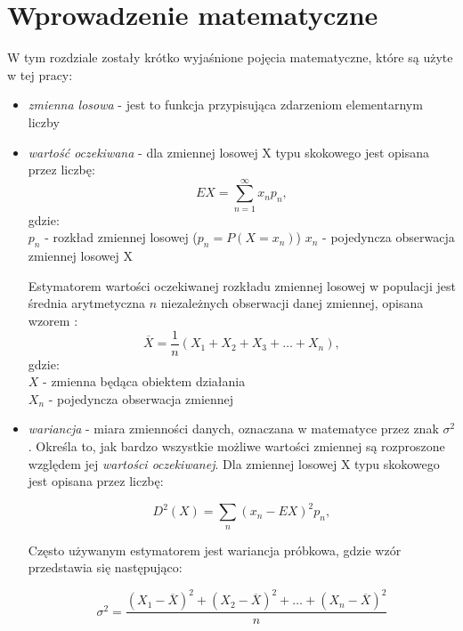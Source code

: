 \documentclass[magister]{dyplom}
\begin{document}
\chapter{Wprowadzenie matematyczne}
W tym rozdziale zostały krótko wyjaśnione pojęcia matematyczne, które są użyte w tej pracy:\\
\begin{itemize}
\item \textit{zmienna losowa} - jest to funkcja przypisująca zdarzeniom elementarnym liczby\cite{random_variable}\newline 

\item \textit{wartość oczekiwana} - dla zmiennej losowej X typu skokowego jest opisana przez liczbę:
\begin{equation}
	EX = \sum_{n=1}^{\infty}x_np_n,
\end{equation}
gdzie:\\
$p_n$ - rozkład zmiennej losowej ($p_n = P(X = x_n)$)
$x_n$ - pojedyncza obserwacja zmiennej losowej X

Estymatorem wartości oczekiwanej rozkładu zmiennej losowej w populacji jest średnia arytmetyczna $n$ niezależnych obserwacji danej zmiennej, opisana wzorem \cite{expected_value}:
\begin{equation}
	\overline{X} = \frac{1}{n}(X_1 + X_2 + X_3 + \dots + X_n),
\end{equation}
gdzie:\\
$X$ - zmienna będąca obiektem działania\\
$X_n$ - pojedyncza obserwacja zmiennej\newline

\item \textit{wariancja} - miara zmienności danych, oznaczana w matematyce przez znak $\sigma^2$. Określa to, jak bardzo wszystkie możliwe wartości zmiennej są rozproszone względem jej \textit{wartości oczekiwanej}. Dla zmiennej losowej X typu skokowego jest opisana przez liczbę:

\begin{equation}
	D^2(X) = \sum_n(x_n - EX)^2p_n,
\end{equation}

Często używanym estymatorem jest wariancja próbkowa, gdzie wzór przedstawia się następująco:

\begin{equation}
	\sigma^2 = \frac{(X_1 - \overline{X})^2 + (X_2 - \overline{X})^2 + \dots + (X_n - \overline{X})^2}{n}
\end{equation}


\end{itemize}
\end{document}
